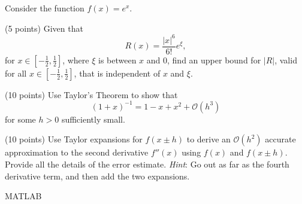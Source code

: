 \documentclass[a4paper,12pt,answers,addpoints]{exam}
\begin{document}
\begin{questions}
\question Consider the function $f(x)=e^{x}$.
%


\question (5 points) Given that
\[
R(x)=\dfrac{|x|^6}{6!}e^{\xi},
\]
for $x\in\left[-\frac{1}{2}, \frac{1}{2}\right]$, where $\xi$ is between $x$ and $0$, find an upper bound for $|R|$, valid for all $x\in \left[-\frac{1}{2}, \frac{1}{2}\right]$, that is independent of $x$ and $\xi$.


\question (10 points) Use Taylor’s Theorem to show that
\[
(1+x)^{-1}=1-x+x^2+\mathcal{O}(h^3)
\]
for some $h>0$ sufficiently small.



\question (10 points) Use Taylor expansions for $f(x\pm h)$ to derive an $\mathcal{O}(h^2)$ accurate approximation to the second derivative $f''(x)$ using $f(x)$ and $f(x\pm h)$. Provide all the details of the error estimate.
\newline
\textit{Hint}: Go out as far as the fourth derivative term, and then add the two expansions.


	
\question MATLAB





\end{questions}
\end{document}
